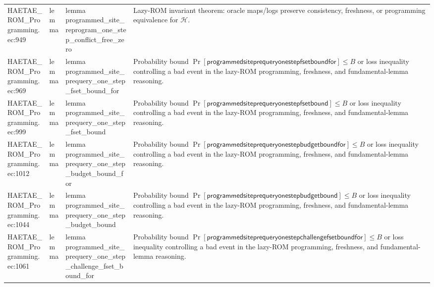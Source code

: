\documentclass[10pt]{article}
\begin{document}
\begin{longtable}{L{0.11\textwidth}L{0.055\textwidth}L{0.385\textwidth}L{0.41\textwidth}}
HAETAE\_\allowbreak{}ROM\_\allowbreak{}Programming.\allowbreak{}ec:\allowbreak{}949 & lemma & {\ttfamily\scriptsize lemma programmed\_\allowbreak{}site\_\allowbreak{}reprogram\_\allowbreak{}one\_\allowbreak{}step\_\allowbreak{}conflict\_\allowbreak{}free\_\allowbreak{}zero} & Lazy-ROM invariant theorem: oracle maps/logs preserve consistency, freshness, or programming equivalence for $\mathcal H$. \\
HAETAE\_\allowbreak{}ROM\_\allowbreak{}Programming.\allowbreak{}ec:\allowbreak{}969 & lemma & {\ttfamily\scriptsize lemma programmed\_\allowbreak{}site\_\allowbreak{}prequery\_\allowbreak{}one\_\allowbreak{}step\_\allowbreak{}fset\_\allowbreak{}bound\_\allowbreak{}for} & Probability bound $\Pr[\mathsf{programmedsiteprequeryonestepfsetboundfor}]\le B$ or loss inequality controlling a bad event in the lazy-ROM programming, freshness, and fundamental-lemma reasoning. \\
HAETAE\_\allowbreak{}ROM\_\allowbreak{}Programming.\allowbreak{}ec:\allowbreak{}999 & lemma & {\ttfamily\scriptsize lemma programmed\_\allowbreak{}site\_\allowbreak{}prequery\_\allowbreak{}one\_\allowbreak{}step\_\allowbreak{}fset\_\allowbreak{}bound} & Probability bound $\Pr[\mathsf{programmedsiteprequeryonestepfsetbound}]\le B$ or loss inequality controlling a bad event in the lazy-ROM programming, freshness, and fundamental-lemma reasoning. \\
HAETAE\_\allowbreak{}ROM\_\allowbreak{}Programming.\allowbreak{}ec:\allowbreak{}1012 & lemma & {\ttfamily\scriptsize lemma programmed\_\allowbreak{}site\_\allowbreak{}prequery\_\allowbreak{}one\_\allowbreak{}step\_\allowbreak{}budget\_\allowbreak{}bound\_\allowbreak{}for} & Probability bound $\Pr[\mathsf{programmedsiteprequeryonestepbudgetboundfor}]\le B$ or loss inequality controlling a bad event in the lazy-ROM programming, freshness, and fundamental-lemma reasoning. \\
HAETAE\_\allowbreak{}ROM\_\allowbreak{}Programming.\allowbreak{}ec:\allowbreak{}1044 & lemma & {\ttfamily\scriptsize lemma programmed\_\allowbreak{}site\_\allowbreak{}prequery\_\allowbreak{}one\_\allowbreak{}step\_\allowbreak{}budget\_\allowbreak{}bound} & Probability bound $\Pr[\mathsf{programmedsiteprequeryonestepbudgetbound}]\le B$ or loss inequality controlling a bad event in the lazy-ROM programming, freshness, and fundamental-lemma reasoning. \\
HAETAE\_\allowbreak{}ROM\_\allowbreak{}Programming.\allowbreak{}ec:\allowbreak{}1061 & lemma & {\ttfamily\scriptsize lemma programmed\_\allowbreak{}site\_\allowbreak{}prequery\_\allowbreak{}one\_\allowbreak{}step\_\allowbreak{}challenge\_\allowbreak{}fset\_\allowbreak{}bound\_\allowbreak{}for} & Probability bound $\Pr[\mathsf{programmedsiteprequeryonestepchallengefsetboundfor}]\le B$ or loss inequality controlling a bad event in the lazy-ROM programming, freshness, and fundamental-lemma reasoning. \\

\end{longtable}
\end{document}
